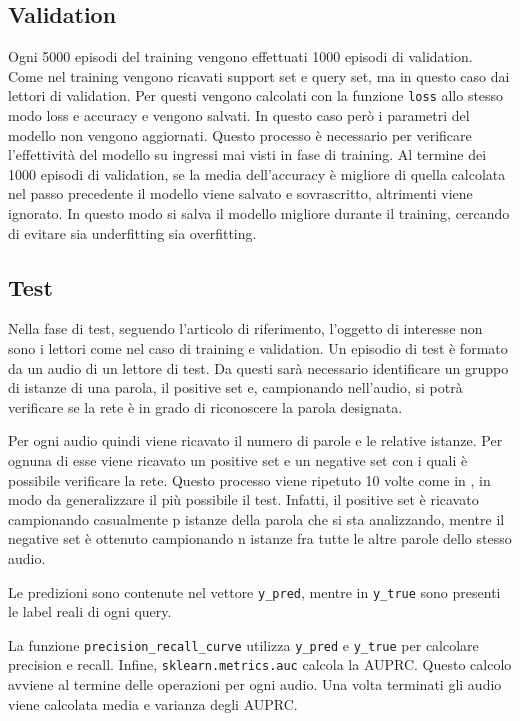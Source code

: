 \documentclass[12pt,a4paper,titlepage]{article}
\begin{document}
\subsection{Validation}
\label{subsec:proto_validation}
Ogni 5000 episodi del training vengono effettuati 1000 episodi di validation.
Come nel training vengono ricavati support set e query set, ma in questo caso dai lettori di validation.
Per questi vengono calcolati con la funzione \texttt{loss} allo stesso modo loss e accuracy e vengono salvati.
In questo caso però i parametri del modello non vengono aggiornati.
Questo processo è necessario per verificare l'effettività del modello su ingressi mai visti in fase di training.
Al termine dei 1000 episodi di validation, se la media dell'accuracy è migliore di quella calcolata nel passo precedente il modello viene salvato e sovrascritto, altrimenti viene ignorato. In questo modo si salva il modello migliore durante il training, cercando di evitare sia underfitting sia overfitting.


\subsection{Test}

Nella fase di test, seguendo l'articolo di riferimento, l'oggetto di interesse non sono i lettori come nel caso di training e validation. Un episodio di test è formato da un audio di un lettore di test. Da questi sarà necessario identificare un gruppo di istanze di una parola, il positive set e, campionando nell'audio, si potrà verificare se la rete è in grado di riconoscere la parola designata.


Per ogni audio quindi viene ricavato il numero di parole e le relative istanze.
Per ognuna di esse viene ricavato un positive set e un negative set con i quali è possibile verificare la rete.
Questo processo viene ripetuto 10 volte come in \cite{Salamon:Few-Shot}, in modo da generalizzare il più possibile il test.
Infatti, il positive set è  ricavato campionando casualmente p istanze della parola che si sta analizzando, mentre il negative set è ottenuto campionando n istanze fra tutte le altre parole dello stesso audio.

Le predizioni sono contenute nel vettore \texttt{y\_pred}, mentre in \texttt{y\_true} sono presenti le label reali di ogni query.

La funzione \texttt{precision\_recall\_curve} utilizza \texttt{y\_pred} e \texttt{y\_true} per calcolare precision e recall.
Infine, \texttt{sklearn.metrics.auc} calcola la AUPRC.
Questo calcolo avviene al termine delle operazioni per ogni audio.
Una volta terminati gli audio viene calcolata media e varianza degli AUPRC.
\end{document}
